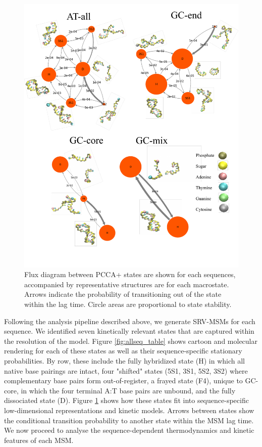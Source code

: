 \documentclass[journal=jpcbfk,manuscript=article]{achemso}
\begin{document}
\begin{figure}[ht!]
	\begin{center}
        \includegraphics[width=120mm, 
        scale=1]{Fig4.pdf}
        \caption{Flux diagram between PCCA+ states are shown for each sequences, accompanied by representative structures are for each macrostate. Arrows indicate the probability of transitioning out of the state within the lag time. Circle areas are proportional to state stability.}
        
        \label{fig:allseq_transition}
	\end{center}
\end{figure}

Following the analysis pipeline described above, we generate SRV-MSMs for each sequence. We identified seven kinetically relevant states that are captured within the resolution of the model. Figure \ref{fig:allseq_table} shows cartoon and molecular rendering for each of these states as well as their sequence-specific stationary probabilities. By row, these include the fully hybridized state (H) in which all native base pairings are intact, four "shifted" states (5S1, 3S1, 5S2, 3S2) where complementary base pairs form out-of-register, a frayed state (F4), unique to GC-core, in which the four terminal A:T base pairs are unbound, and the fully dissociated state (D). Figure \ref{fig:allseq_transition} shows how these states fit into sequence-specific low-dimensional representations and kinetic models. Arrows between states show the conditional transition probability to another state within the MSM lag time. We now proceed to analyse the sequence-dependent thermodynamics and kinetic features of each MSM.
\end{document}
